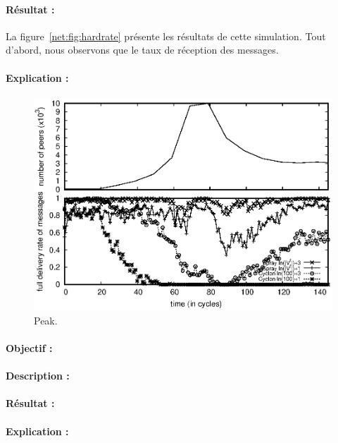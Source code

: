 \paragraph{Résultat :} La figure~\ref{net:fig:hardrate} présente les résultats
de cette simulation. Tout d'abord, nous observons que le taux de réception des
messages.
\paragraph{Explication :}

\begin{figure}
  \begin{center}
    \includegraphics[width=.8\textwidth]{img/spray/peak.eps}
    \caption[Peak]{\label{net:fig:peak} Peak.}
  \end{center}
\end{figure}

\paragraph{Objectif :}
\paragraph{Description :}
\paragraph{Résultat :}
\paragraph{Explication :}

